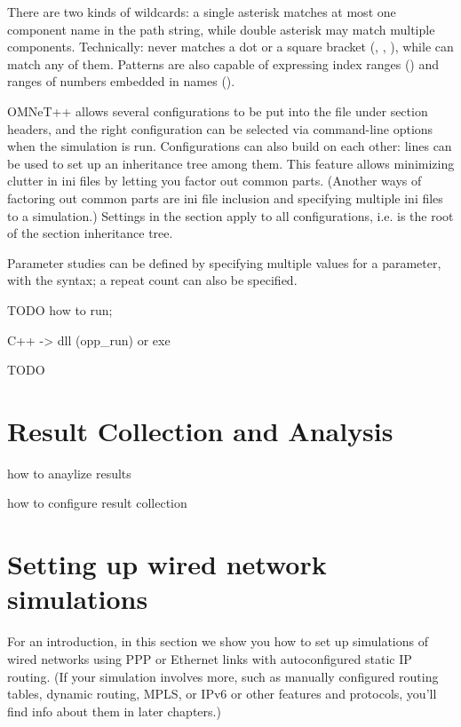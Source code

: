 There are two kinds of wildcards: a single asterisk \ttt{*} matches at most
one component name in the path string, while double asterisk \ttt{**} may
match multiple components. Technically: \ttt{*} never matches a dot or a
square bracket (, \ttt{[}, \ttt{]}), while \ttt{**} can match any of
them. Patterns are also capable of expressing index ranges
() and ranges of numbers embedded
in names ().

OMNeT++ allows several configurations to be put into the 
file under  section headers, and the right
configuration can be selected via command-line options when the simulation
is run. Configurations can also build on each other: 
lines can be used to set up an inheritance tree among them. This feature
allows minimizing clutter in ini files by letting you factor out common
parts. (Another ways of factoring out common parts are ini file inclusion
and specifying multiple ini files to a simulation.) Settings in the
\ttt{[General]} section apply to all configurations, i.e. \ttt{[General]}
is the root of the section inheritance tree.

Parameter studies can be defined by specifying multiple values for a
parameter, with the  syntax;
a repeat count can also be specified.

\ifdraft TODO
how to run;

C++ -> dll (opp\_run) or exe
\fi

\ifdraft TODO
\section{Result Collection and Analysis}

how to anaylize results

how to configure result collection
\fi


\section{Setting up wired network simulations}

For an introduction, in this section we show you how to set up simulations
of wired networks using PPP or Ethernet links with autoconfigured static IP
routing. (If your simulation involves more, such as manually configured
routing tables, dynamic routing, MPLS, or IPv6 or other features and protocols,
you'll find info about them in later chapters.)

